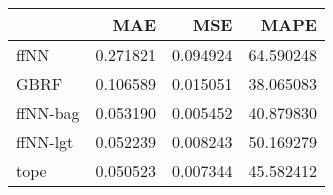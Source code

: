 \begin{tabular}{lrrr}
\toprule
{} &       MAE &       MSE &       MAPE \\
\midrule
ffNN     &  0.271821 &  0.094924 &  64.590248 \\
GBRF     &  0.106589 &  0.015051 &  38.065083 \\
ffNN-bag &  0.053190 &  0.005452 &  40.879830 \\
ffNN-lgt &  0.052239 &  0.008243 &  50.169279 \\
tope     &  0.050523 &  0.007344 &  45.582412 \\
\bottomrule
\end{tabular}
